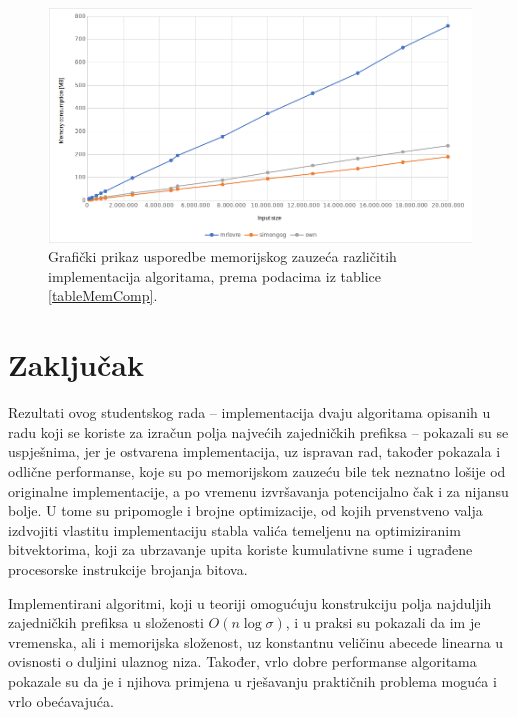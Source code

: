 \documentclass[a4paper,12pt]{article}
\begin{document}
\begin{figure}[h!]
	\begin{center}
		\includegraphics[width=\columnwidth]{memoryGraph.png}
 		\caption{Grafički prikaz usporedbe memorijskog zauzeća različitih implementacija algoritama, prema podacima iz tablice \ref{tableMemComp}.}
 		\label{fig:graphMem}
	\end{center}
\end{figure}

\clearpage
\section{Zaključak}

Rezultati ovog studentskog rada -- implementacija dvaju algoritama opisanih u radu \cite{beller2013} koji se koriste za izračun polja najvećih zajedničkih prefiksa -- pokazali su se uspješnima, jer je ostvarena implementacija, uz ispravan rad, također pokazala i odlične performanse, koje su po memorijskom zauzeću bile tek neznatno lošije od originalne implementacije, a po vremenu izvršavanja potencijalno čak i za nijansu bolje. U tome su pripomogle i brojne optimizacije, od kojih prvenstveno valja izdvojiti vlastitu implementaciju stabla valića temeljenu na optimiziranim bitvektorima, koji za ubrzavanje upita koriste kumulativne sume i ugrađene procesorske instrukcije brojanja bitova.

Implementirani algoritmi, koji u teoriji omogućuju konstrukciju polja najduljih zajedničkih prefiksa u složenosti $O(n \log \sigma)$, i u praksi su pokazali da im je vremenska, ali i memorijska složenost, uz konstantnu veličinu abecede linearna u ovisnosti o duljini ulaznog niza. Također, vrlo dobre performanse algoritama pokazale su da je i njihova primjena u rješavanju praktičnih problema moguća i vrlo obećavajuća.
\end{document}
